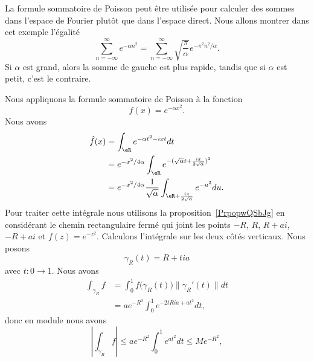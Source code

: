 \begin{example}\label{ExDLjesf}
	La formule sommatoire de Poisson peut être utilisée pour calculer des sommes dans l'espace de Fourier plutôt que dans l'espace direct. Nous allons montrer dans cet exemple l'égalité
	\begin{equation}
		\sum_{n=-\infty}^{\infty} e^{-\alpha n^2}=\sum_{n=-\infty}^{\infty}\sqrt{\frac{ \pi }{ \alpha }} e^{-\pi^2 n^2/\alpha}.
	\end{equation}
	Si \( \alpha\) est grand, alors la somme de gauche est plus rapide, tandis que si \( \alpha\) est petit, c'est le contraire.

	Nous appliquons la formule sommatoire de Poisson à la fonction
	\begin{equation}
		f(x)= e^{-\alpha x^2}.
	\end{equation}
	Nous avons
	\begin{subequations}        \label{EqCDeLht}
		\begin{align}
			\hat f(x) & =\int_{\eR} e^{-\alpha t^2-ixt}dt                                                               \\
			          & = e^{-x^2/4\alpha}\int_{\eR}e^{ -(\sqrt{\alpha}t+\frac{ ix }{ 2\sqrt{\alpha} })^2 }             \\
			          & = e^{-x^2/4\alpha}\frac{1}{ \sqrt{\alpha} }\int_{\eR+\frac{ ix }{ 2\sqrt{\alpha} }} e^{-u^2}du.
		\end{align}
	\end{subequations}
	Pour traiter cette intégrale nous utilisons la proposition~\ref{PrpopwQSbJg} en considérant le chemin rectangulaire fermé qui joint les points \( -R\), \( R\), \( R+ai\), \( -R+ai\) et \( f(z)= e^{-z^2}\). Calculons l'intégrale sur les deux côtés verticaux. Nous posons
	\begin{equation}
		\gamma_R(t)=R+tia
	\end{equation}
	avec \( t\colon 0\to 1\). Nous avons
	\begin{subequations}
		\begin{align}
			\int_{\gamma_R}f & =\int_0^1f\big( \gamma_R(t) \big)\| \gamma_R'(t) \|dt \\
			                 & =a e^{-R^2}\int_0^1 e^{-2tRia+at^2}dt,
		\end{align}
	\end{subequations}
	donc en module nous avons
	\begin{equation}
		| \int_{\gamma_R}f |\leq a e^{-R^2}\int_0^1 e^{at^2}dt\leq M e^{-R^2},
	\end{equation}

\end{example}
